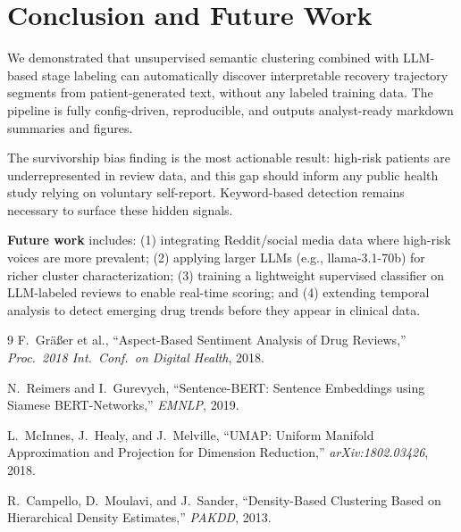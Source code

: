 \documentclass[10pt,twocolumn]{article}
\begin{document}
\section{Conclusion and Future Work}
We demonstrated that unsupervised semantic clustering combined with
LLM-based stage labeling can automatically discover interpretable recovery
trajectory segments from patient-generated text, without any labeled
training data. The pipeline is fully config-driven, reproducible, and
outputs analyst-ready markdown summaries and figures.

The survivorship bias finding is the most actionable result: high-risk
patients are underrepresented in review data, and this gap should inform
any public health study relying on voluntary self-report. Keyword-based
detection remains necessary to surface these hidden signals.

\textbf{Future work} includes: (1) integrating Reddit/social media data
where high-risk voices are more prevalent; (2) applying larger LLMs
(e.g., llama-3.1-70b) for richer cluster characterization; (3) training a
lightweight supervised classifier on LLM-labeled reviews to enable
real-time scoring; and (4) extending temporal analysis to detect emerging
drug trends before they appear in clinical data.

\begin{thebibliography}{9}
F.\ Gr\"{a}{\ss}er et al., ``Aspect-Based Sentiment Analysis of Drug Reviews,''
\textit{Proc.\ 2018 Int.\ Conf.\ on Digital Health}, 2018.

N.\ Reimers and I.\ Gurevych, ``Sentence-BERT: Sentence Embeddings using
Siamese BERT-Networks,'' \textit{EMNLP}, 2019.

L.\ McInnes, J.\ Healy, and J.\ Melville, ``UMAP: Uniform Manifold Approximation
and Projection for Dimension Reduction,'' \textit{arXiv:1802.03426}, 2018.

R.\ Campello, D.\ Moulavi, and J.\ Sander, ``Density-Based Clustering Based on
Hierarchical Density Estimates,'' \textit{PAKDD}, 2013.
\end{thebibliography}
\end{document}
